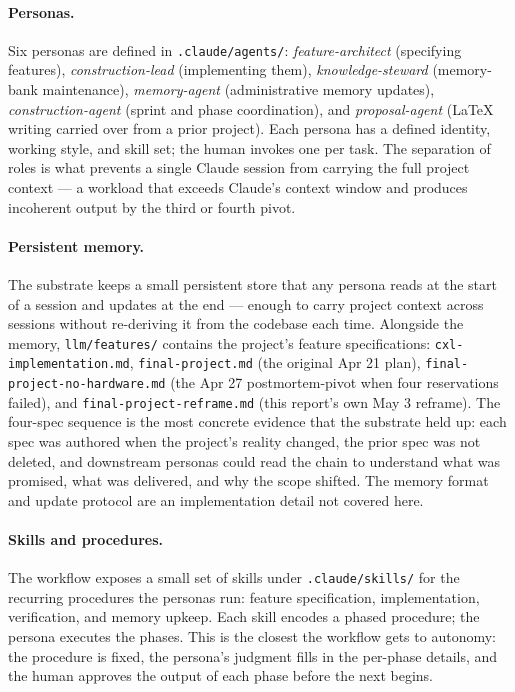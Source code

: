 \documentclass[11pt,a4paper]{article}
\begin{document}
\paragraph{Personas.} Six personas are defined in \texttt{.claude/agents/}: \emph{feature-architect} (specifying features), \emph{construction-lead} (implementing them), \emph{knowledge-steward} (memory-bank maintenance), \emph{memory-agent} (administrative memory updates), \emph{construction-agent} (sprint and phase coordination), and \emph{proposal-agent} (LaTeX writing carried over from a prior project). Each persona has a defined identity, working style, and skill set; the human invokes one per task. The separation of roles is what prevents a single Claude session from carrying the full project context --- a workload that exceeds Claude's context window and produces incoherent output by the third or fourth pivot.

\paragraph{Persistent memory.} The substrate keeps a small persistent store that any persona reads at the start of a session and updates at the end --- enough to carry project context across sessions without re-deriving it from the codebase each time. Alongside the memory, \texttt{llm/features/} contains the project's feature specifications: \texttt{cxl-implementation.md}, \texttt{final-project.md} (the original Apr 21 plan), \texttt{final-project-no-hardware.md} (the Apr 27 postmortem-pivot when four reservations failed), and \texttt{final-project-reframe.md} (this report's own May 3 reframe). The four-spec sequence is the most concrete evidence that the substrate held up: each spec was authored when the project's reality changed, the prior spec was not deleted, and downstream personas could read the chain to understand what was promised, what was delivered, and why the scope shifted. The memory format and update protocol are an implementation detail not covered here.

\paragraph{Skills and procedures.} The workflow exposes a small set of skills under \texttt{.claude/skills/} for the recurring procedures the personas run: feature specification, implementation, verification, and memory upkeep. Each skill encodes a phased procedure; the persona executes the phases. This is the closest the workflow gets to autonomy: the procedure is fixed, the persona's judgment fills in the per-phase details, and the human approves the output of each phase before the next begins.
\end{document}

